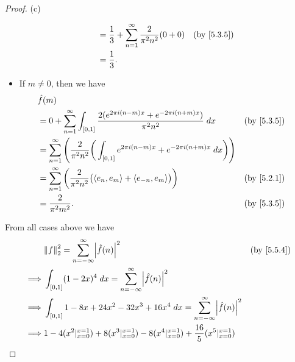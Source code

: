 \begin{proof}{(c)}
\begin{itemize}
\begin{align*}
                       & = \dfrac{1}{3} + \sum_{n = 1}^\infty \dfrac{2}{\pi^2 n^2} (0 + 0)                                                                       &  & \text{(by \cref{5.3.5})}    \\
                       & = \dfrac{1}{3}.
          \end{align*}
    \item If \(m \neq 0\), then we have
          \begin{align*}
             & \hat{f}(m)                                                                                                                                                           \\
             & = 0 + \sum_{n = 1}^\infty \int_{[0, 1]} \dfrac{2 (e^{2 \pi i (n - m) x} + e^{- 2 \pi i (n + m) x})}{\pi^2 n^2} \; dx                   &  & \text{(by \cref{5.3.5})} \\
             & = \sum_{n = 1}^\infty \Bigg(\dfrac{2}{\pi^2 n^2} \bigg(\int_{[0, 1]} e^{2 \pi i (n - m) x} + e^{- 2 \pi i (n + m) x} \; dx\bigg)\Bigg)                               \\
             & = \sum_{n = 1}^\infty \bigg(\dfrac{2}{\pi^2 n^2} \big(\inner*{e_n, e_m} + \inner*{e_{-n}, e_m}\big)\bigg)                              &  & \text{(by \cref{5.2.1})} \\
             & = \dfrac{2}{\pi^2 m^2}.                                                                                                                &  & \text{(by \cref{5.3.5})}
          \end{align*}
  \end{itemize}
  From all cases above we have
  \begin{align*}
             & \norm*{f}_2^2 = \sum_{n = -\infty}^\infty \abs{\hat{f}(n)}^2                                                                         &  & \text{(by \cref{5.5.4})}      \\
    \implies & \int_{[0, 1]} (1 - 2x)^4 \; dx = \sum_{n = -\infty}^\infty \abs{\hat{f}(n)}^2                                                                                           \\
    \implies & \int_{[0, 1]} 1 - 8x + 24x^2 - 32x^3 + 16x^4 \; dx = \sum_{n = -\infty}^\infty \abs{\hat{f}(n)}^2                                                                       \\
    \implies & 1 - 4 (x^2|_{x = 0}^{x = 1}) + 8 (x^3|_{x = 0}^{x = 1}) - 8(x^4|_{x = 0}^{x = 1}) + \dfrac{16}{5}(x^5|_{x = 0}^{x = 1})                                                 \\

\end{align*}
\end{proof}
